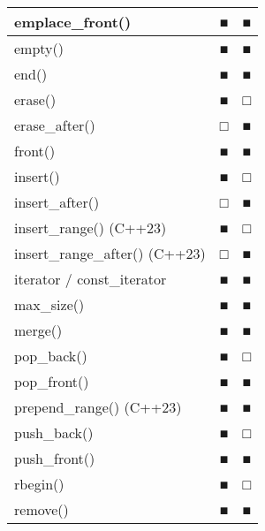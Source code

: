 \begin{longtable}{|l|l|l|}
emplace\_front()                             & ■             & ■                      \\ \hline
empty()                                      & ■             & ■                      \\ \hline
end()                                        & ■             & ■                      \\ \hline
erase()                                      & ■             & □                      \\ \hline
erase\_after()                               & □             & ■                      \\ \hline
front()                                      & ■             & ■                      \\ \hline
insert()                                     & ■             & □                      \\ \hline
insert\_after()                              & □             & ■                      \\ \hline
insert\_range() (C++23)                      & ■             & □                      \\ \hline
insert\_range\_after() (C++23)               & □             & ■                      \\ \hline
iterator / const\_iterator                   & ■             & ■                      \\ \hline
max\_size()                                  & ■             & ■                      \\ \hline
merge()                                      & ■             & ■                      \\ \hline
pop\_back()                                  & ■             & □                      \\ \hline
pop\_front()                                 & ■             & ■                      \\ \hline
prepend\_range() (C++23)                     & ■             & ■                      \\ \hline
push\_back()                                 & ■             & □                      \\ \hline
push\_front()                                & ■             & ■                      \\ \hline
rbegin()                                     & ■             & □                      \\ \hline
remove()                                     & ■             & ■                      \\ \hline

\end{longtable}
